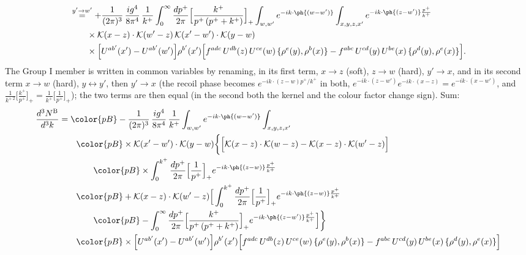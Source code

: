 \begin{align}
&\overset{y'\to w'}{=}+\frac{1}{(2\pi)^{3}}\,\frac{ig^{4}}{8\pi^{4}}\,\frac{1}{k^{+}}\int_{0}^{\infty}\frac{dp^{+}}{2\pi}\Big[\frac{k^{+}}{p^{+}\,(p^{+}+k^{+})}\Big]_{+}\int_{w,w'}e^{-ik\cdot\ph{(w-w')}}\int_{x,y,z,x'}e^{-ik\cdot\ph{(z-w')}\frac{p^{+}}{k^{+}}}\notag\\
&\qquad\times\mathcal{K}(x-z)\cdot\mathcal{K}(w'-z)\,\mathcal{K}(x'-w')\cdot\mathcal{K}(y-w)\notag\\
&\qquad\times\Big[U^{ab'}(x')-U^{ab'}(w')\Big]\rho^{b'}(x')\Big[f^{adc}\,U^{db}(z)\,U^{ce}(w)\,\{\rho^{e}(y),\rho^{b}(x)\}-f^{abc}\,U^{cd}(y)\,U^{be}(x)\,\{\rho^{d}(y),\rho^{e}(x)\}\Big].\notag
\end{align}
\endgroup
The Group I member is written in common variables by renaming, in its first term, $x\to z$ (soft), $z\to w$ (hard), $y'\to x$, and in its second term $x\to w$ (hard), $y\leftrightarrow y'$, then $y'\to x$ (the recoil phase becomes $e^{-ik\cdot(z-w)p^{+}/k^{+}}$ in both, $e^{-ik\cdot(z-w')}e^{-ik\cdot(x-z)}=e^{-ik\cdot(x-w')}$, and $\frac{1}{k^{+\,2}}\big[\frac{k^{+}}{p^{+}}\big]_{+}=\frac{1}{k^{+}}\big[\frac{1}{p^{+}}\big]_{+}$); the two terms are then equal (in the second both the kernel and the colour factor change sign). Sum:
\begin{align}
\frac{d^{3}N^{\rm B}}{d^{3}k}&={\color{pB}-\frac{1}{(2\pi)^{3}}\,\frac{ig^{4}}{8\pi^{4}}\,\frac{1}{k^{+}}\int_{w,w'}e^{-ik\cdot\ph{(w-w')}}\int_{x,y,z,x'}}\notag\\
&\qquad{\color{pB}\times\mathcal{K}(x'-w')\cdot\mathcal{K}(y-w)\bigg\{\Big[\mathcal{K}(x-z)\cdot\mathcal{K}(w-z)-\mathcal{K}(x-z)\cdot\mathcal{K}(w'-z)\Big]}\notag\\
&\qquad\qquad{\color{pB}\times\int_{0}^{k^{+}}\frac{dp^{+}}{2\pi}\Big[\frac{1}{p^{+}}\Big]_{+}e^{-ik\cdot\ph{(z-w)}\frac{p^{+}}{k^{+}}}}\notag\\
&\qquad{\color{pB}+\mathcal{K}(x-z)\cdot\mathcal{K}(w'-z)\Big[\int_{0}^{k^{+}}\frac{dp^{+}}{2\pi}\Big[\frac{1}{p^{+}}\Big]_{+}e^{-ik\cdot\ph{(z-w)}\frac{p^{+}}{k^{+}}}}\notag\\
&\qquad\qquad{\color{pB}-\int_{0}^{\infty}\frac{dp^{+}}{2\pi}\Big[\frac{k^{+}}{p^{+}\,(p^{+}+k^{+})}\Big]_{+}e^{-ik\cdot\ph{(z-w')}\frac{p^{+}}{k^{+}}}\Big]\bigg\}}\notag\\
&\qquad{\color{pB}\times\Big[U^{ab'}(x')-U^{ab'}(w')\Big]\rho^{b'}(x')\Big[f^{adc}\,U^{db}(z)\,U^{ce}(w)\,\{\rho^{e}(y),\rho^{b}(x)\}-f^{abc}\,U^{cd}(y)\,U^{be}(x)\,\{\rho^{d}(y),\rho^{e}(x)\}\Big]}\label{eq:C-B}
\end{align}
